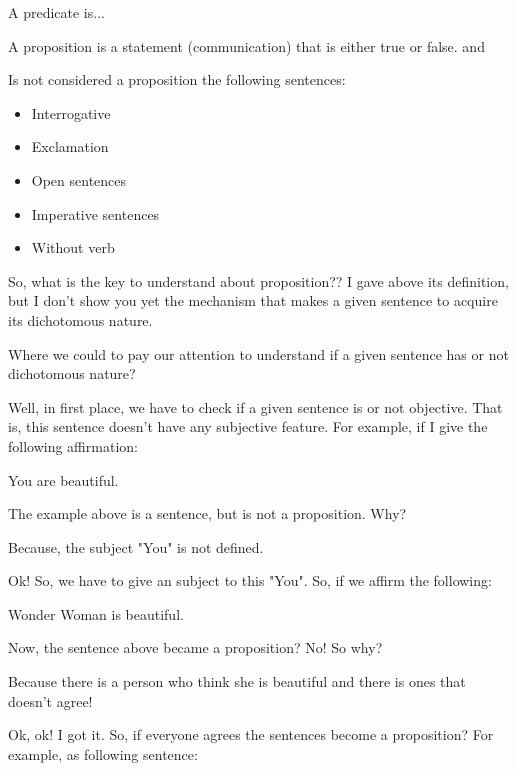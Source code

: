 \begin{definition}[Predicate]
    A predicate is...
\end{definition}

\begin{definition}[Proposition]
A proposition is a statement (communication) that is either true or false. \cite{ericlehman} and \cite{judithlgersting}
\end{definition}

Is not considered a proposition the following sentences:

\begin{itemize}
    \item Interrogative
    \item Exclamation
    \item Open sentences
    \item Imperative sentences
    \item Without verb
\end{itemize}

So, what is the key to understand about proposition?? I gave above its definition, but I don't show you yet the mechanism that makes a given sentence to acquire its dichotomous nature.

Where we could to pay our attention to understand if a given sentence has or not dichotomous nature?

Well, in first place, we have to check if a given sentence is or not objective. That is, this sentence doesn't have any subjective feature. For example, if I give the following affirmation:

\begin{example}\label{exemplo1}
    You are beautiful.
\end{example}

The example above is a sentence, but is not a proposition. Why?

Because, the subject "You" is not defined.

Ok! So, we have to give an subject to this "You". So, if we affirm the following:

\begin{example}
    Wonder Woman is beautiful.
\end{example}

Now, the sentence above became a proposition? No! So why?

Because there is a person who think she is beautiful and there is ones that doesn't agree!

Ok, ok! I got it. So, if everyone agrees the sentences become a proposition? For example, as following sentence:

